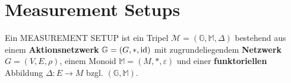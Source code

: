 
\chapter{Measurement Setups}
\begin{definition}
Ein MEASUREMENT SETUP ist ein Tripel $\mathcal{M}=(\mathbb{G},\mathbb{M},\Delta)$ bestehend aus einem \textbf{Aktionsnetzwerk} $\mathbb{G}=(G,\ast,\operatorname{id})$ mit zugrundeliegendem \textbf{Netzwerk} $G=(V,E,\rho)$, einem Monoid $\mathbb{M}=(M,\ast,\varepsilon)$ und einer \textbf{funktoriellen} Abbildung $\Delta:E\to M$ bzgl. $(\mathbb{G},\mathbb{M})$.
\end{definition}


